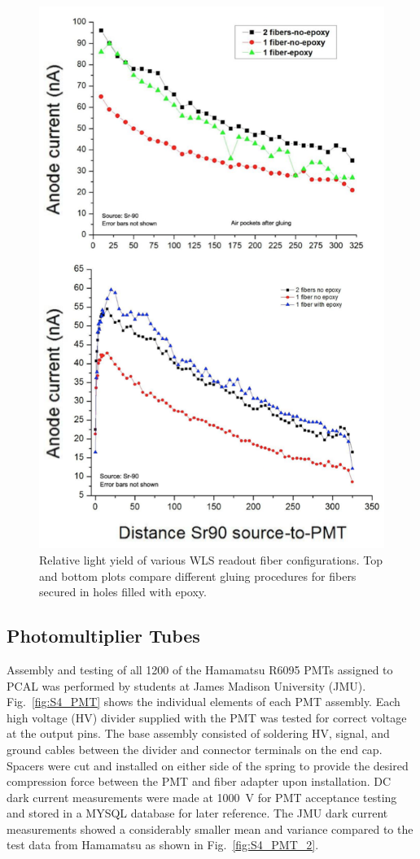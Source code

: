 \begin{figure}[hbt]
\centering
\includegraphics[width=0.85\columnwidth,keepaspectratio]{img/S4_4.png}
\caption{Relative light yield of various WLS readout fiber configurations. Top and bottom plots compare different
  gluing procedures for fibers secured in holes filled with epoxy.}
\label{fig:S4_4}
\end{figure}

\subsection{Photomultiplier Tubes}

Assembly and testing of all 1200 of the Hamamatsu R6095 PMTs assigned to PCAL was performed by students
at James Madison University (JMU). Fig.~\ref{fig:S4_PMT} shows the individual elements of each PMT assembly.
Each high voltage (HV) divider supplied with the PMT was tested for correct voltage at the output pins. The base
assembly consisted of soldering HV, signal, and ground cables between the divider and connector terminals on the
end cap. Spacers were cut and installed on either side of the spring to provide the desired compression force
between the PMT and fiber adapter upon installation. DC dark current measurements were made at 1000~V for
PMT acceptance testing and stored in a MYSQL database for later reference. The JMU dark current
measurements showed a considerably smaller mean and variance compared to the test data from Hamamatsu as
shown in Fig.~\ref{fig:S4_PMT_2}. 

